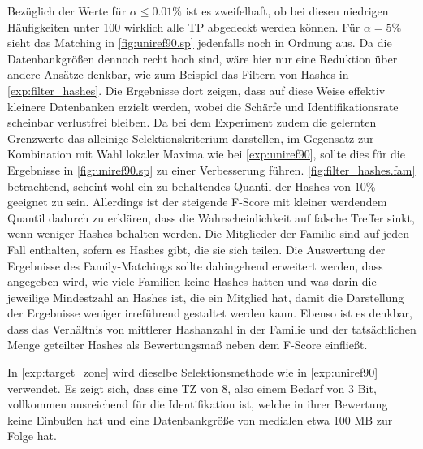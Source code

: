    Bezüglich der Werte für $\alpha \le 0.01\%$ ist es zweifelhaft, ob bei diesen niedrigen Häufigkeiten unter 100 wirklich alle \ac{TP} abgedeckt werden können. Für $\alpha=5\%$ sieht das Matching in \autoref{fig:uniref90.sp} jedenfalls noch in Ordnung aus. Da die Datenbankgrößen dennoch recht hoch sind, wäre hier nur eine Reduktion über andere Ansätze denkbar, wie zum Beispiel das Filtern von Hashes in \autoref{exp:filter_hashes}. Die Ergebnisse dort zeigen, dass auf diese Weise effektiv kleinere Datenbanken erzielt werden, wobei die Schärfe und Identifikationsrate scheinbar verlustfrei bleiben. Da bei dem Experiment zudem die gelernten Grenzwerte das alleinige Selektionskriterium darstellen, im Gegensatz zur Kombination mit Wahl lokaler Maxima wie bei \autoref{exp:uniref90}, sollte dies für die Ergebnisse in \autoref{fig:uniref90.sp} zu einer Verbesserung führen. \autoref{fig:filter_hashes.fam} betrachtend, scheint wohl ein zu behaltendes Quantil der Hashes von $10\%$ geeignet zu sein. Allerdings ist der steigende F-Score mit kleiner werdendem Quantil dadurch zu erklären, dass die Wahrscheinlichkeit auf falsche Treffer sinkt, wenn weniger Hashes behalten werden. Die Mitglieder der Familie sind auf jeden Fall enthalten, sofern es Hashes gibt, die sie sich teilen. Die Auswertung der Ergebnisse des Family-Matchings sollte dahingehend erweitert werden, dass angegeben wird, wie viele Familien keine Hashes hatten und was darin die jeweilige Mindestzahl an Hashes ist, die ein Mitglied hat, damit die Darstellung der Ergebnisse weniger irreführend gestaltet werden kann. Ebenso ist es denkbar, dass das Verhältnis von mittlerer Hashanzahl in der Familie und der tatsächlichen Menge geteilter Hashes als Bewertungsmaß neben dem F-Score einfließt.

    In \autoref{exp:target_zone} wird dieselbe Selektionsmethode wie in \autoref{exp:uniref90} verwendet. Es zeigt sich, dass eine \acf{TZ} von 8, also einem Bedarf von 3 Bit, vollkommen ausreichend für die Identifikation ist, welche in ihrer Bewertung keine Einbußen hat und eine Datenbankgröße von medialen etwa 100 \acs{MB} zur Folge hat.

